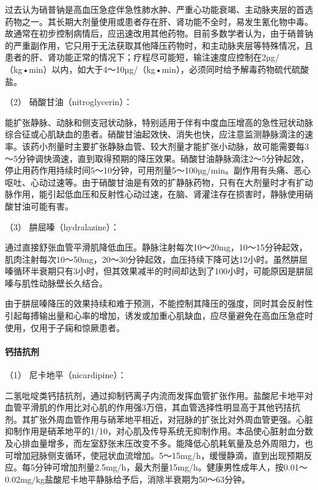 过去认为硝普钠是高血压急症伴急性肺水肿、严重心功能衰竭、主动脉夹层的首选药物之一。其长期大剂量使用或患者存在肝、肾功能不全时，易发生氰化物中毒。故通常在初步控制病情后，应迅速改用其他药物。目前多数学者认为，由于硝普钠的严重副作用，它只用于无法获取其他降压药物时，和主动脉夹层等特殊情况，且患者的肝、肾功能正常的情况下；疗程尽可能短，输注速度应控制在2µg/（kg•min）以内，如大于4～10µg/（kg•min），必须同时给予解毒药物硫代硫酸盐。

\hypertarget{text00108.htmlux5cux23CHP4-7-3-2-2-1-2}{}
（2） 硝酸甘油（nitroglycerin）：

能扩张静脉、动脉和侧支冠状动脉，特别适用于伴有中度血压增高的急性冠状动脉综合征或心肌缺血的患者。硝酸甘油起效快、消失也快，应注意监测静脉滴注的速率。该药小剂量时主要扩张静脉血管、较大剂量才能扩张小动脉，故可能需要每3～5分钟调快滴速，直到取得预期的降压效果。硝酸甘油静脉滴注2～5分钟起效，停止用药作用持续时间5～10分钟，可用剂量5～100µg/min。副作用有头痛、恶心呕吐、心动过速等。由于硝酸甘油是有效的扩静脉药物，只有在大剂量时才有扩动脉作用，能引起低血压和反射性心动过速，在脑、肾灌注存在损害时，静脉使用硝酸甘油可能有害。

\hypertarget{text00108.htmlux5cux23CHP4-7-3-2-2-1-3}{}
（3） 肼屈嗪（hydralazine）：

通过直接舒张血管平滑肌降低血压。静脉注射每次10～20mg，10～15分钟起效，肌肉注射每次10～50mg，20～30分钟起效，血压持续下降可达12小时。虽然肼屈嗪循环半衰期只有3小时，但其效果减半的时间却达到了100小时，可能原因是肼屈嗪与肌性动脉壁长久结合。

由于肼屈嗪降压的效果持续和难于预测，不能控制其降压的强度，同时其会反射性引起每搏输出量和心率的增加，诱发或加重心肌缺血，应尽量避免在高血压急症时使用，仅用于子痫和惊厥患者。

\paragraph{钙拮抗剂}

\hypertarget{text00108.htmlux5cux23CHP4-7-3-2-2-2-1}{}
（1） 尼卡地平（nicardipine）：

二氢吡啶类钙拮抗剂，通过抑制钙离子内流而发挥血管扩张作用。盐酸尼卡地平对血管平滑肌的作用比对心肌的作用强3万倍，其血管选择性明显高于其他钙拮抗剂。其扩张外周血管作用与硝苯地平相近，对冠脉的扩张比对外周血管更强。心脏抑制作用是硝苯地平的1/10，对心肌及传导系统无抑制作用。本品使心脏射血分数及心排血量增多，而左室舒张末压改变不多。能降低心肌耗氧量及总外周阻力，也可增加冠脉侧支循环，使冠状血流增加。5～15mg/h，缓慢静滴，直到出现预期反应。每5分钟可增加剂量2.5mg/h，最大剂量15mg/h。健康男性成年人，按0.01～0.02mg/kg盐酸尼卡地平静脉给予后，消除半衰期为50～63分钟。

